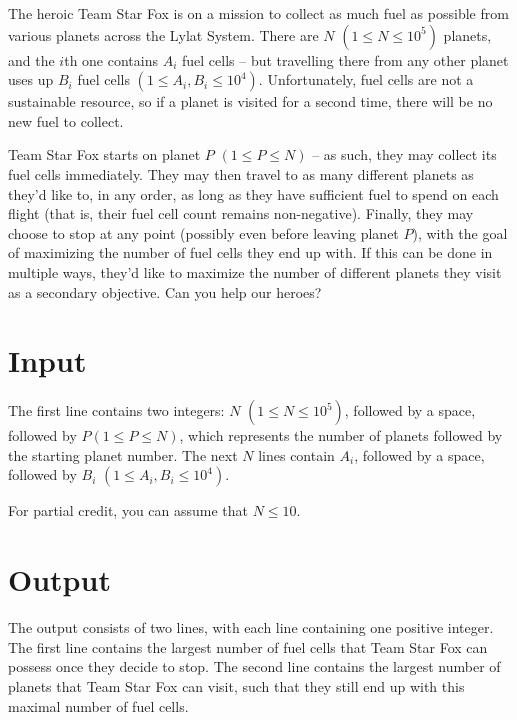 
The heroic Team Star Fox is on a mission to collect as much fuel as possible
from various planets across the Lylat System. There are $N$ $(1 \leq N \leq 10^5)$ planets, and the
$i$th one contains $A_i$ fuel cells -- but travelling there from any other planet uses up $B_i$ fuel
cells $(1 \leq A_i,B_i \leq 10^4)$. Unfortunately, fuel cells are not a sustainable resource, so if
a planet is visited for a second time, there will be no new fuel to collect.

Team Star Fox starts on planet $P$ $(1 \leq P \leq N)$ -- as such, they may collect its fuel cells
immediately. They may then travel to as many different planets as they'd like to, in any order, as
long as they have sufficient fuel to spend on each flight (that is, their fuel cell count remains
non-negative). Finally, they may choose to stop at any point (possibly even before leaving planet
$P$), with the goal of maximizing the number of fuel cells they end up with. If this can be done in
multiple ways, they'd like to maximize the number of different planets they visit as a secondary
objective. Can you help our heroes?

\section*{Input}
The first line contains two integers: $N$ $(1 \leq N \leq 10^5)$, followed by a space, followed by
$P (1 \leq P \leq N)$, which represents the number of planets followed by the starting planet
number. The next $N$ lines contain $A_i$, followed by a space, followed by $B_i$ $(1 \leq A_i, B_i
\leq 10^4)$.

For partial credit, you can assume that $N \leq 10$.

\section*{Output}
The output consists of two lines, with each line containing one positive integer. The first line
contains the largest number of fuel cells that Team Star Fox can possess once they decide to stop.
The second line contains the largest number of planets that Team Star Fox can visit, such that they
still end up with this maximal number of fuel cells.
